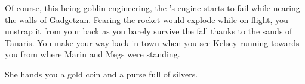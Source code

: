 Of course, this being goblin engineering, the 's engine starts to fail while nearing the walls of Gadgetzan. Fearing the rocket would explode while on flight, you unstrap it from your back as you barely survive the fall thanks to the sands of Tanaris. You make your way back in town when you see Kelsey running towards you from where Marin and Megs were standing.


She hands you a gold coin and a purse full of silvers.

